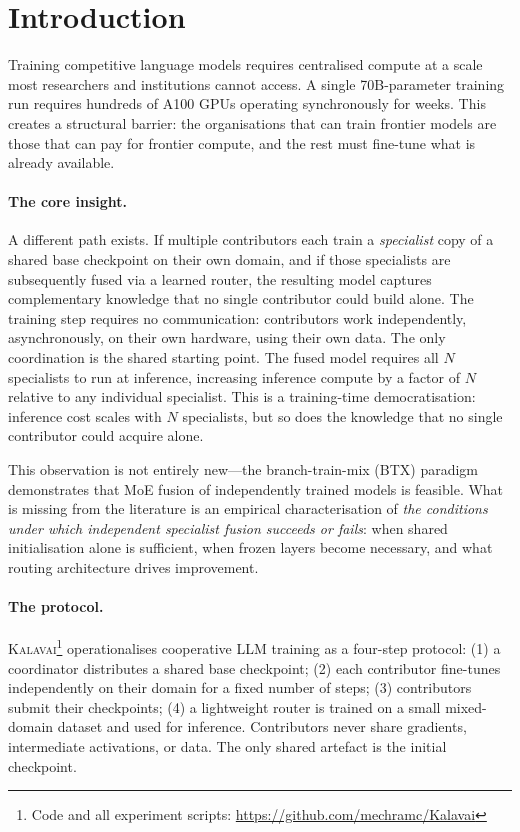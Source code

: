 \documentclass{article}
\newcommand{\kalavai}{\textsc{Kalavai}\xspace}
\begin{document}
\section{Introduction}
\label{sec:intro}

Training competitive language models requires centralised compute at a scale most researchers and institutions cannot access. A single 70B-parameter training run requires hundreds of A100 GPUs operating synchronously for weeks. This creates a structural barrier: the organisations that can train frontier models are those that can pay for frontier compute, and the rest must fine-tune what is already available.

\paragraph{The core insight.} A different path exists. If multiple contributors each train a \emph{specialist} copy of a shared base checkpoint on their own domain, and if those specialists are subsequently fused via a learned router, the resulting model captures complementary knowledge that no single contributor could build alone. The training step requires no communication: contributors work independently, asynchronously, on their own hardware, using their own data. The only coordination is the shared starting point. The fused model requires all $N$ specialists to run at inference, increasing inference compute by a factor of $N$ relative to any individual specialist. This is a training-time democratisation: inference cost scales with $N$ specialists, but so does the knowledge that no single contributor could acquire alone.

This observation is not entirely new---the branch-train-mix (BTX) paradigm \citep{sukhbaatar2024branchtrainmix} demonstrates that MoE fusion of independently trained models is feasible. What is missing from the literature is an empirical characterisation of \emph{the conditions under which independent specialist fusion succeeds or fails}: when shared initialisation alone is sufficient, when frozen layers become necessary, and what routing architecture drives improvement.

\paragraph{The protocol.} \kalavai\footnote{Code and all experiment scripts: \url{https://github.com/mechramc/Kalavai}} operationalises cooperative LLM training as a four-step protocol: (1) a coordinator distributes a shared base checkpoint; (2) each contributor fine-tunes independently on their domain for a fixed number of steps; (3) contributors submit their checkpoints; (4) a lightweight router is trained on a small mixed-domain dataset and used for inference. Contributors never share gradients, intermediate activations, or data. The only shared artefact is the initial checkpoint.
\end{document}
